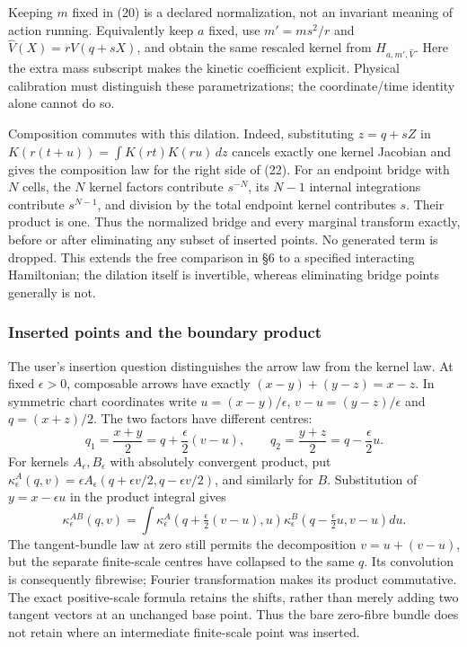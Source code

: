 \documentclass[11pt,a4paper]{article}
\begin{document}
Keeping \(m\) fixed in (20) is a declared normalization, not an
invariant meaning of action running. Equivalently keep \(a\) fixed, use
\(m'=ms^2/r\) and \(\widehat V(X)=rV(q+sX)\), and obtain the same
rescaled kernel from \(H_{a,m',\widehat V}\). Here the extra mass
subscript makes the kinetic coefficient explicit. Physical calibration
must distinguish these parametrizations; the coordinate/time identity
alone cannot do so.

Composition commutes with this dilation. Indeed, substituting \(z=q+sZ\)
in \(K(r(t+u))=\int K(rt)K(ru)\,dz\) cancels exactly one kernel Jacobian
and gives the composition law for the right side of (22). For an
endpoint bridge with \(N\) cells, the \(N\) kernel factors contribute
\(s^{-N}\), its \(N-1\) internal integrations contribute \(s^{N-1}\),
and division by the total endpoint kernel contributes \(s\). Their
product is one. Thus the normalized bridge and every marginal transform
exactly, before or after eliminating any subset of inserted points. No
generated term is dropped. This extends the free comparison in §6 to a
specified interacting Hamiltonian; the dilation itself is invertible,
whereas eliminating bridge points generally is not.

\subsubsection{Inserted points and the boundary
product}\label{inserted-points-and-the-boundary-product}

The user's insertion question distinguishes the arrow law from the
kernel law. At fixed \(\epsilon>0\), composable arrows have exactly
\((x-y)+(y-z)=x-z\). In symmetric chart coordinates write
\(u=(x-y)/\epsilon\), \(v-u=(y-z)/\epsilon\) and \(q=(x+z)/2\). The two
factors have different centres: \[
 q_1=\frac{x+y}{2}=q+\frac\epsilon2(v-u),\qquad
 q_2=\frac{y+z}{2}=q-\frac\epsilon2u.
 \tag{22a}
\] For kernels \(A_\epsilon,B_\epsilon\) with absolutely convergent
product, put \(\kappa^A_\epsilon(q,v)=\epsilon
A_\epsilon(q+\epsilon v/2,q-\epsilon v/2)\), and similarly for \(B\).
Substitution of \(y=x-\epsilon u\) in the product integral gives \[
 \kappa^{AB}_\epsilon(q,v)=\int
 \kappa^A_\epsilon\!\left(q+\tfrac\epsilon2(v-u),u\right)
 \kappa^B_\epsilon\!\left(q-\tfrac\epsilon2u,v-u\right)du.
 \tag{22b}
\] The tangent-bundle law at zero still permits the decomposition
\(v=u+(v-u)\), but the separate finite-scale centres have collapsed to
the same \(q\). Its convolution is consequently fibrewise; Fourier
transformation makes its product commutative. The exact positive-scale
formula retains the shifts, rather than merely adding two tangent
vectors at an unchanged base point. Thus the bare zero-fibre bundle does
not retain where an intermediate finite-scale point was inserted.
\end{document}
